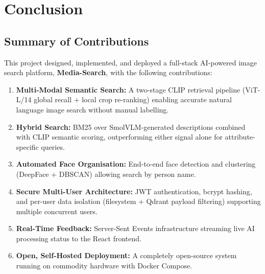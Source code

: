 \documentclass[12pt,a4paper,oneside]{report}
\begin{document}
\chapter{Conclusion}

\section{Summary of Contributions}
This project designed, implemented, and deployed a full-stack AI-powered
image search platform, \textbf{Media-Search}, with the following
contributions:

\begin{enumerate}[leftmargin=*]
  \item \textbf{Multi-Modal Semantic Search:} A two-stage CLIP retrieval
        pipeline (ViT-L/14 global recall + local crop re-ranking) enabling
        accurate natural language image search without manual labelling.
  \item \textbf{Hybrid Search:} BM25 over SmolVLM-generated descriptions
        combined with CLIP semantic scoring, outperforming either signal
        alone for attribute-specific queries.
  \item \textbf{Automated Face Organisation:} End-to-end face detection and
        clustering (DeepFace + DBSCAN) allowing search by person name.
  \item \textbf{Secure Multi-User Architecture:} JWT authentication,
        bcrypt hashing, and per-user data isolation (filesystem + Qdrant
        payload filtering) supporting multiple concurrent users.
  \item \textbf{Real-Time Feedback:} Server-Sent Events infrastructure
        streaming live AI processing status to the React frontend.
  \item \textbf{Open, Self-Hosted Deployment:} A completely open-source
        system running on commodity hardware with Docker Compose.
\end{enumerate}
\end{document}
